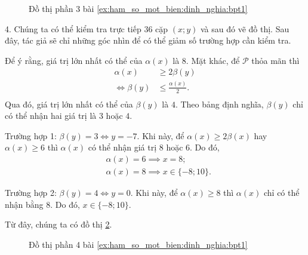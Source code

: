 \begin{figure}[H]
   \centering
   \caption{Đồ thị phần 3 bài \ref{ex:ham_so_mot_bien:dinh_nghia:bpt1}}
   \label{fig:ham_so_mot_bien:dinh_nghia:bpt3}
\end{figure}

4. Chúng ta có thể kiểm tra trực tiếp $36$ cặp $(x; y)$ và sau đó vẽ đồ thị. Sau đây, tác giả sẽ chỉ những góc nhìn để có thể giảm số trường hợp cần kiểm tra.

Để ý rằng, giá trị lớn nhất có thể của $\alpha(x)$ là $8$. Mặt khác, để $\mathcal{P}$ thỏa mãn thì
\begin{align*}
   \alpha(x) &\geq 2\beta(y) \\
   \iff \beta(y) &\leq \frac{\alpha(x)}{2}. \\
\end{align*}
Qua đó, giá trị lớn nhất có thể của $\beta(y)$ là $4$. Theo bảng định nghĩa, $\beta(y)$ chỉ có thể nhận hai giá trị là $3$ hoặc $4$. 

\textcolor{colorEmphasisCyan}{Trường hợp 1}: $\beta(y) = 3 \iff y = -7$. Khi này, để $\alpha(x) \geq 2\beta(x)$ hay $\alpha(x) \geq 6$ thì $\alpha(x)$ có thể nhận giá trị $8$ hoặc $6$. Do đó,
\begin{align*}
   &\alpha(x) = 6 \implies x = 8;\\
   &\alpha(x) = 8 \implies x \in \{-8; 10\}.
\end{align*}

\textcolor{colorEmphasis}{Trường hợp 2}: $\beta(y) = 4 \iff y = 0$. Khi này, để $\alpha(x) \geq 8$ thì $\alpha(x)$ chỉ có thể nhận bằng $8$. Do đó, $x \in \{-8; 10\}$.

Từ đây, chúng ta có đồ thị \ref{fig:ham_so_mot_bien:dinh_nghia:bpt4}.

\begin{figure}[H]
   \centering
   \caption{Đồ thị phần 4 bài \ref{ex:ham_so_mot_bien:dinh_nghia:bpt1}}
   \label{fig:ham_so_mot_bien:dinh_nghia:bpt4}
\end{figure}

